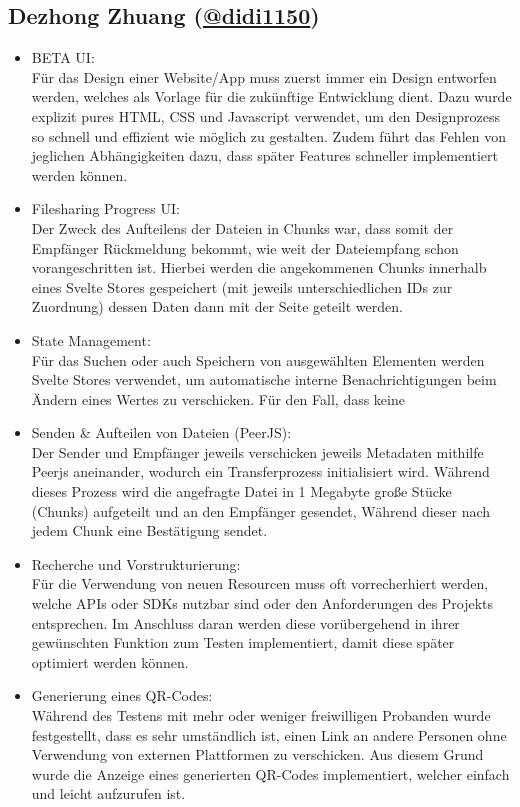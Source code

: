 \documentclass[a4paper]{article}
\begin{document}
\subsection{Dezhong Zhuang (\href{https://github.com/didi1150}{@didi1150})}
\begin{itemize}
      \item BETA UI:\\
            Für das Design einer Website/App muss zuerst immer ein Design
            entworfen werden, welches als Vorlage für die zukünftige Entwicklung
            dient. Dazu wurde explizit pures HTML, CSS und Javascript verwendet,
            um den Designprozess so schnell und effizient wie möglich zu
            gestalten. Zudem führt das Fehlen von jeglichen Abhängigkeiten dazu,
            dass später Features schneller implementiert werden können.
      \item Filesharing Progress UI:\\
            Der Zweck des Aufteilens der Dateien in Chunks war, dass somit der
            Empfänger Rückmeldung bekommt, wie weit der Dateiempfang schon
            vorangeschritten ist. Hierbei werden die angekommenen Chunks
            innerhalb eines Svelte Stores gespeichert (mit jeweils
            unterschiedlichen IDs zur Zuordnung) dessen Daten dann mit der Seite
            geteilt werden.
      \item State Management:\\
            Für das Suchen oder auch Speichern von ausgewählten Elementen werden
            Svelte Stores verwendet, um automatische interne Benachrichtigungen
            beim Ändern eines Wertes zu verschicken. Für den Fall, dass keine
      \item Senden \& Aufteilen von Dateien (PeerJS):\\
            Der Sender und Empfänger jeweils verschicken jeweils Metadaten
            mithilfe Peerjs aneinander, wodurch ein Transferprozess
            initialisiert wird. Während dieses Prozess wird die angefragte Datei
            in 1 Megabyte große Stücke (Chunks) aufgeteilt und an den Empfänger
            gesendet, Während dieser nach jedem Chunk eine Bestätigung sendet.
      \item Recherche und Vorstrukturierung:\\
            Für die Verwendung von neuen Resourcen muss oft vorrecherhiert
            werden, welche APIs oder SDKs nutzbar sind oder den Anforderungen
            des Projekts entsprechen. Im Anschluss daran werden diese
            vorübergehend in ihrer gewünschten Funktion zum Testen
            implementiert, damit diese später optimiert werden können.
      \item Generierung eines QR-Codes:\\
            Während des Testens mit mehr oder weniger freiwilligen Probanden
            wurde festgestellt, dass es sehr umständlich ist, einen Link an
            andere Personen ohne Verwendung von externen Plattformen zu
            verschicken. Aus diesem Grund wurde die Anzeige eines generierten
            QR-Codes implementiert, welcher einfach und leicht aufzurufen ist.
\end{itemize}
\end{document}
